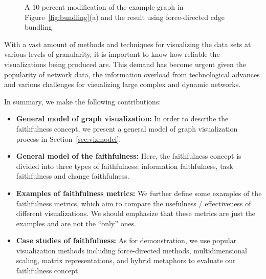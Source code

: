 \documentclass[10pt,journal,cspaper,compsoc]{IEEEtran}
\begin{document}
\begin{figure}\centering
{}
\caption{A 10 percent modification of the example graph in Figure~\ref{fig:bundling}(a) and the result using force-directed edge bundling}\label{fig:bundling1}
\end{figure}

With a vast amount of methods and techniques for visualizing the data sets at various levels of granularity, it is important to know how reliable the visualizations being produced are. This demand has become urgent given the popularity of network data, the information overload from technological advances and various challenges for visualizing large complex and dynamic networks.


In summary, we make the following contributions:
\begin{itemize}
\item{\bf General model of graph visualization:} In order to describe the faithfulness concept, we present a general model of graph visualization process in Section~\ref{sec:vizmodel}.
\item{\bf General model of the faithfulness:} Here, the faithfulness concept is divided into three types of faithfulness: information faithfulness, task faithfulness and change faithfulness.
\item{\bf Examples of faithfulness metrics:} We further define some examples of the faithfulness metrics, which aim to compare the usefulness / effectiveness of different visualizations. We should emphasize that these metrics are just the examples and are not the ``only'' ones.
\item{\bf Case studies of faithfulness:}  As for demonstration, we use popular visualization methods including force-directed methods, multidimensional scaling, matrix representations, and hybrid metaphors to evaluate our faithfulness concept.
\end{itemize}
\end{document}
